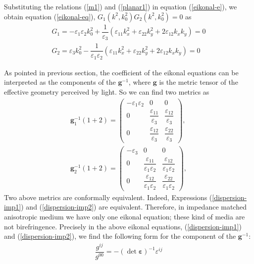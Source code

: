 \documentclass[9pt,twocolumn,twoside]{osajnl}
\begin{document}
Substituting the relations (\ref{m1}) and (\ref{planar1}) in equation (\ref{eikonal-e}), we obtain equation (\ref{eikonal-eq}), $G_{1}(k^2,k^2_{0})G_{2}(k^2,k^2_{0})=0$ as
\begin{eqnarray}
G_{1}=-\varepsilon_{1}\varepsilon_{2} k_{0}^{2}+\dfrac{1}{\varepsilon_{3}} \left(\varepsilon_{11}k_{x}^{2}+\varepsilon_{22}k_{y}^{2}+2\varepsilon_{12}k_{x}k_{y}\right)=0 \label{dispersion-imp1}\\ 
G_{2}=\varepsilon_{3} k_{0}^{2}-\dfrac{1}{\varepsilon_{1}\varepsilon_{2}}\left(\varepsilon_{11} k_{x}^{2}+\varepsilon_{22}k_{y}^{2}+2\varepsilon_{12}k_{x}k_{y}\right)=0
\label{dispersion-imp2}
\end{eqnarray}

As pointed in previous section, the coefficient of the eikonal equations can be interpreted as the components of the $\mathbf{g}^{-1}$, where $\mathbf{g}$ is the metric tensor of the effective geometry perceived by light. So we can find two metrics as
\begin{gather}
\mathbf{g}^{-1}_{1}(1+2)=
\begin{pmatrix}
-\varepsilon_{1}\varepsilon_{2}&0&0\\
0&\dfrac{\varepsilon_{11}}{\varepsilon_{3}}& \dfrac{\varepsilon_{12}}{\varepsilon_{3}}\\
0&\dfrac{\varepsilon_{12}}{\varepsilon_{3}}&\dfrac{\varepsilon_{22}}{\varepsilon_{3}}
\end{pmatrix}, \label{m1-imp} \\
\mathbf{g}^{-1}_{2}(1+2)=
\begin{pmatrix}
-\varepsilon_{3}&0&0\\
0&\dfrac{\varepsilon_{11}}{\varepsilon_{1}\varepsilon_{2}}& \dfrac{\varepsilon_{12}}{\varepsilon_{1}\varepsilon_{2}}\\
0&\dfrac{\varepsilon_{12}}{\varepsilon_{1}\varepsilon_{2}}&\dfrac{\varepsilon_{22}}{\varepsilon_{1}\varepsilon_{2}}
\end{pmatrix},
\end{gather}
Two above metrics  are conformally equivalent. Indeed, Expressions (\ref{dispersion-imp1}) and (\ref{dispersion-imp2}) are equivalent. Therefore, in impedance matched anisotropic medium we have only one eikonal equation; these kind of media are not birefringence. Precisely in the above eikonal equations, (\ref{dispersion-imp1}) and (\ref{dispersion-imp2}), we find the following form for the component of the $\mathbf{g}^{-1}$:
\begin{eqnarray}\label{m-imp}
\dfrac{g^{ij}}{g^{00}}=-(\det{\boldsymbol{\varepsilon}})^{-1}\varepsilon^{ij}
\end{eqnarray}
\end{document}
